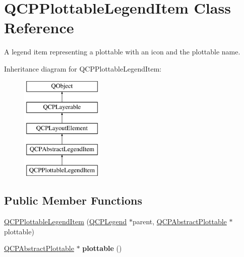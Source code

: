 \hypertarget{class_q_c_p_plottable_legend_item}{}\section{Q\+C\+P\+Plottable\+Legend\+Item Class Reference}
\label{class_q_c_p_plottable_legend_item}


A legend item representing a plottable with an icon and the plottable name.  


Inheritance diagram for Q\+C\+P\+Plottable\+Legend\+Item\+:\begin{figure}[H]
\begin{center}
\leavevmode
\includegraphics[height=5.000000cm]{class_q_c_p_plottable_legend_item}
\end{center}
\end{figure}
\subsection*{Public Member Functions}
\begin{DoxyCompactItemize}
\item 
\hyperlink{class_q_c_p_plottable_legend_item_ac1072591fe409d3dabad51b23ee4d6c5}{Q\+C\+P\+Plottable\+Legend\+Item} (\hyperlink{class_q_c_p_legend}{Q\+C\+P\+Legend} $\ast$parent, \hyperlink{class_q_c_p_abstract_plottable}{Q\+C\+P\+Abstract\+Plottable} $\ast$plottable)
\item 
\mbox{\label{class_q_c_p_plottable_legend_item_af29e9a2c60b4cba0cac2447b8af7b488}} 
\hyperlink{class_q_c_p_abstract_plottable}{Q\+C\+P\+Abstract\+Plottable} $\ast$ {\bfseries plottable} ()
\end{DoxyCompactItemize}
